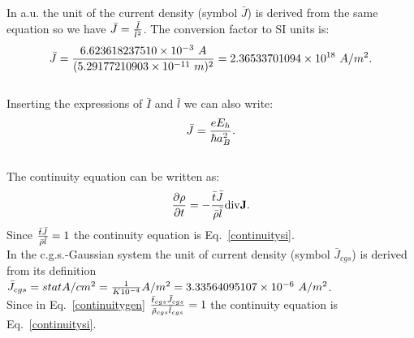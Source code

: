 \documentclass[12pt,a4paper]{article}
\def\barl{5.29177210903\times 10^{-11}}
\def\bari{6.623618237510\times 10^{-3}}
\def\barcur{2.36533701094\times 10^{18}}
\def\curtocur{3.33564095107\times 10^{-6}}
\begin{document}
{\color{web-blue} In a.u. the unit of the current density (symbol $\bar J$) 
is derived 
from the same equation so we have $\bar J ={\bar I \over \bar l^2}$. The
conversion factor to SI units is: 
\begin{equation}
\bar J = {\bari\ A\over (\barl\ m)^2}=\barcur\ A/m^2. 
\end{equation}
\\
Inserting the expressions of $\bar I$ and $\bar l$ we can also write:
\begin{equation}
\bar J = {e E_h \over \hbar a_B^2}. 
\end{equation}
\\
The continuity equation can be written as:
\begin{equation}
{\partial \rho \over \partial t}=-{\bar t \bar J \over \bar \rho \bar l} {\rm div} {\bf J}.
\label{continuitygen}
\end{equation}
Since ${\bar t \bar J \over \bar \rho \bar l}=1$ the continuity equation 
is Eq.~\ref{continuitysi}.
}
\\

{\color{orange} In the c.g.s.-Gaussian system the unit of current density  
(symbol $\bar J_{cgs}$) is derived from its definition 
$\bar J_{cgs}=statA/cm^2 = {1 \over K 10^{-4}} A/m^2=\curtocur\ A/m^2$.
\\
Since in Eq.~\ref{continuitygen} ${\bar t_{cgs} \bar J_{cgs} \over 
\bar \rho_{cgs} \bar l_{cgs}}=1$ the continuity equation is 
Eq.~\ref{continuitysi}.
}
\\

\end{document}
